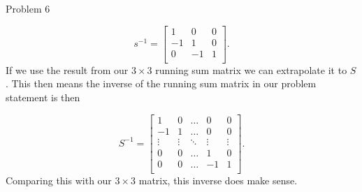 \begin{problem}{Problem 6}
\begin{highlight}[Solution]
        \begin{equation}
            s^{-1} = 
            \begin{bmatrix}
                1 & 0 & 0 \\
                -1 & 1 & 0 \\
                0 & -1 & 1 \\
            \end{bmatrix}.
        \end{equation}
        If we use the result from our $3 \times 3$ running sum matrix we can extrapolate it to $S$. This then means the inverse of the running sum matrix in our problem statement is then

        \begin{equation}
            S^{-1} = 
            \begin{bmatrix}
                1 & 0 & \dots & 0 & 0 \\
                -1 & 1 & \dots & 0 & 0 \\
                \vdots & \vdots & \ddots & \vdots & \vdots \\
                0 & 0 & \dots & 1 & 0 \\
                0 & 0 & \dots & -1 & 1 \\
            \end{bmatrix}.
        \end{equation}
        Comparing this with our $3 \times 3$ matrix, this inverse does make sense.
    \end{highlight}
\end{problem}


